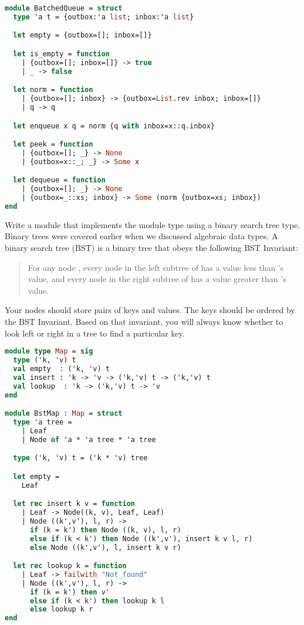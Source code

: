 \begin{lstlisting}[language=OCaml]
module BatchedQueue = struct
  type 'a t = {outbox:'a list; inbox:'a list}

  let empty = {outbox=[]; inbox=[]}

  let is_empty = function
    | {outbox=[]; inbox=[]} -> true
    | _ -> false

  let norm = function
    | {outbox=[]; inbox} -> {outbox=List.rev inbox; inbox=[]}
    | q -> q

  let enqueue x q = norm {q with inbox=x::q.inbox}

  let peek = function
    | {outbox=[]; _} -> None
    | {outbox=x::_; _} -> Some x

  let dequeue = function
    | {outbox=[]; _} -> None
    | {outbox=_::xs; inbox} -> Some (norm {outbox=xs; inbox})
end
\end{lstlisting}

Write a module  that implements the  module type using a binary search tree type. Binary trees were covered earlier when we discussed algebraic data types. A binary search tree (BST) is a binary tree that obeys the following BST Invariant:
\begin{quote}
  For any node , every node in the left subtree of  has a value less than 's value, and every node in the right subtree of  has a value greater than 's value.
\end{quote}
Your nodes should store pairs of keys and values. The keys should be ordered by the BST Invariant. Based on that invariant, you will always know whether to look left or right in a tree to find a particular key.

\begin{lstlisting}[language=OCaml]
module type Map = sig
  type ('k, 'v) t
  val empty  : ('k, 'v) t
  val insert : 'k -> 'v -> ('k,'v) t -> ('k,'v) t
  val lookup  : 'k -> ('k,'v) t -> 'v
end

module BstMap : Map = struct
  type 'a tree =
    | Leaf
    | Node of 'a * 'a tree * 'a tree

  type ('k, 'v) t = ('k * 'v) tree

  let empty =
    Leaf

  let rec insert k v = function
    | Leaf -> Node((k, v), Leaf, Leaf)
    | Node ((k',v'), l, r) ->
      if (k = k') then Node ((k, v), l, r)
      else if (k < k') then Node ((k',v'), insert k v l, r)
      else Node ((k',v'), l, insert k v r)

  let rec lookup k = function
    | Leaf -> failwith "Not_found"
    | Node ((k',v'), l, r) ->
      if (k = k') then v'
      else if (k < k') then lookup k l
      else lookup k r
end
\end{lstlisting}

